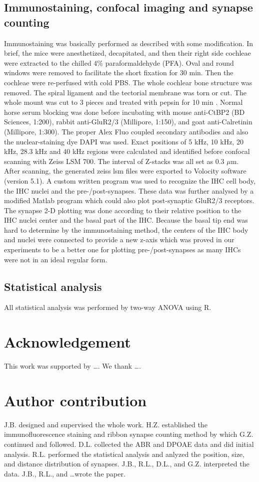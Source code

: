 \documentclass[11pt]{article}
\begin{document}
\subsection {Immunostaining, confocal imaging and synapse counting}
Immunostaining was basically performed as described \cite{Liberman2011} with some modification. In brief, the mice were anesthetized, decapitated, and then their right side cochleae were extracted to the chilled 4\% paraformaldehyde (PFA). Oval and round windows were removed to facilitate the short fixation for 30 min. Then the cochleae were re-perfused with cold PBS. The whole cochlear bone structure was removed. The spiral ligament and the tectorial membrane was torn or cut. The whole mount was cut to 3 pieces and treated with pepsin for 10 min \cite{Nagy2004}. Normal horse serum blocking was done before incubating with mouse anti-CtBP2 (BD Sciences, 1:200), rabbit anti-GluR2/3 (Millipore, 1:150), and goat anti-Calretinin (Millipore, 1:300). The proper Alex Fluo coupled secondary antibodies and also the nuclear-staining dye DAPI was used. Exact positions of 5 kHz, 10 kHz, 20 kHz, 28.3 kHz and 40 kHz regions were calculated \cite{Viberg2004} and identified before confocal scanning with Zeiss LSM 700. The interval of Z-stacks was all set as 0.3 $\mu$m. After scanning, the generated zeiss lsm files were exported to Volocity software (version 5.1). A custom written program was used to recognize the IHC cell body, the IHC nuclei and the pre-/post-synapses. These data was further analysed by a modified Matlab program which could also plot post-synaptic GluR2/3 receptors. The synapse 2-D plotting was done according to their relative position to the IHC nuclei center and the basal part of the IHC. Because the basal tip end was hard to determine by the immunostaining method, the centers of the IHC body and nuclei were connected to provide a new z-axis which was proved in our experiments to be a better one for plotting pre-/post-synapses as many IHCs were not in an ideal regular form.

\subsection {Statistical analysis}
All statistical analysis was performed by two-way ANOVA using R\cite{Rcite2011}. 

\section{Acknowledgement}
This work was supported by \ldots. We thank \ldots.

\section{Author contribution}
J.B. designed and supervised the whole work. H.Z. established the immunofluorescence staining and ribbon synapse counting method by which G.Z. continued and followed. D.L. collected the ABR and DPOAE data and did initial analysis. R.L. performed the statistical analysis and anlyzed the position, size, and distance distribution of synapses. J.B., R.L., D.L., and G.Z. interpreted the data. J.B., R.L., and \ldots wrote the paper.


\end{document}
